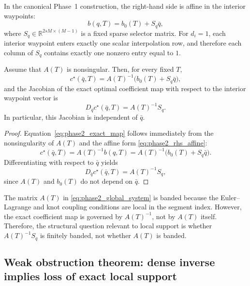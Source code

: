 In the canonical Phase~1 construction, the right-hand side is affine in the interior waypoints:
\begin{equation}
\label{eq:phase2_rhs_affine}
b(q,T)=b_0(T)+S_q \bar q,
\end{equation}
where \(S_q\in\mathbb R^{2sM\times(M-1)}\) is a fixed sparse selector matrix.
For \(d_i=1\), each interior waypoint enters exactly one scalar interpolation row, and therefore each column of \(S_q\) contains exactly one nonzero entry equal to \(1\).

\begin{lemma}
\label{lem:phase2_exact_sensitivity}
Assume that \(A(T)\) is nonsingular.
Then, for every fixed \(T\),
\begin{equation}
\label{eq:phase2_exact_map}
c^\star(\bar q,T)=A(T)^{-1}\bigl(b_0(T)+S_q\bar q\bigr),
\end{equation}
and the Jacobian of the exact optimal coefficient map with respect to the interior waypoint vector is
\begin{equation}
\label{eq:phase2_jacobian_exact}
D_{\bar q}c^\star(\bar q,T)=A(T)^{-1}S_q.
\end{equation}
In particular, this Jacobian is independent of \(\bar q\).
\end{lemma}

\begin{proof}
Equation~\eqref{eq:phase2_exact_map} follows immediately from the nonsingularity of \(A(T)\) and the affine form \eqref{eq:phase2_rhs_affine}:
\[
c^\star(\bar q,T)
=
A(T)^{-1}b(q,T)
=
A(T)^{-1}\bigl(b_0(T)+S_q\bar q\bigr).
\]
Differentiating with respect to \(\bar q\) yields
\[
D_{\bar q}c^\star(\bar q,T)=A(T)^{-1}S_q,
\]
since \(A(T)\) and \(b_0(T)\) do not depend on \(\bar q\).
\end{proof}

\begin{remark}
\label{rem:phase2_banded_not_enough}
The matrix \(A(T)\) in \eqref{eq:phase2_global_system} is banded because the Euler--Lagrange and knot coupling conditions are local in the segment index.
However, the exact coefficient map is governed by \(A(T)^{-1}\), not by \(A(T)\) itself.
Therefore, the structural question relevant to local support is whether \(A(T)^{-1}S_q\) is finitely banded, not whether \(A(T)\) is banded.
\end{remark}

\subsection{Weak obstruction theorem: dense inverse implies loss of exact local support}
\label{subsec:phase2_weak_theorem}

